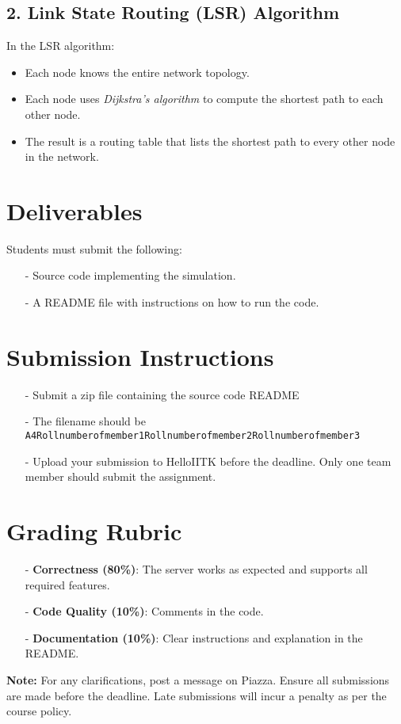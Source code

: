 \documentclass[12pt,a4paper]{article}
\begin{document}
\subsection*{2. Link State Routing (LSR) Algorithm}
In the LSR algorithm:
\begin{itemize}
    \item Each node knows the entire network topology.
    \item Each node uses \emph{Dijkstra’s algorithm} to compute the shortest path to each other node.
    \item The result is a routing table that lists the shortest path to every other node in the network.
\end{itemize}

 

 
\section*{Deliverables}
Students must submit the following:
\begin{itemize}
\item[-] Source code implementing the simulation.
\item[-] A README file with instructions on how to run the code. 
\end{itemize}
 
 
 

 
\section*{Submission Instructions}
\begin{itemize}
\item[-] Submit a zip file containing the source code README
\item[-] The filename should be \texttt{A4Rollnumberofmember1Rollnumberofmember2Rollnumberofmember3} 
\item[-] Upload your submission to HelloIITK before the deadline. Only one team member should submit the assignment. 
\end{itemize}


\section*{Grading Rubric}
\begin{itemize}
    \item[-] \textbf{Correctness (80\%)}: The server works as expected and supports all required features.
    \item[-] \textbf{Code Quality (10\%)}: Comments in the code.
    \item[-] \textbf{Documentation (10\%)}: Clear instructions and explanation in the README.
\end{itemize}

\vfill
\noindent \textbf{Note:} For any clarifications, post a message on Piazza. Ensure all submissions are made before the deadline. Late submissions will incur a penalty as per the course policy.
\end{document}
